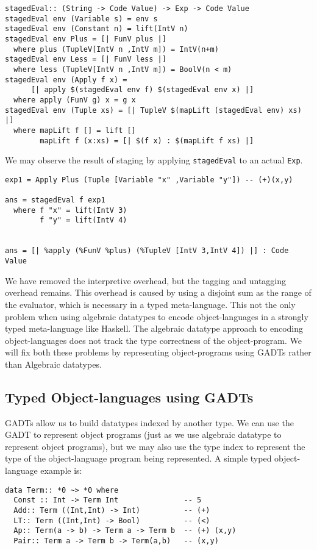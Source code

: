 \documentclass[11pt,twoside,A4]{llncs}
\begin{document}
{\small 
\begin{verbatim}
stagedEval:: (String -> Code Value) -> Exp -> Code Value
stagedEval env (Variable s) = env s
stagedEval env (Constant n) = lift(IntV n)
stagedEval env Plus = [| FunV plus |]
  where plus (TupleV[IntV n ,IntV m]) = IntV(n+m)
stagedEval env Less = [| FunV less |]
  where less (TupleV[IntV n ,IntV m]) = BoolV(n < m) 
stagedEval env (Apply f x) = 
      [| apply $(stagedEval env f) $(stagedEval env x) |]
  where apply (FunV g) x = g x
stagedEval env (Tuple xs) = [| TupleV $(mapLift (stagedEval env) xs) |]
  where mapLift f [] = lift []
        mapLift f (x:xs) = [| $(f x) : $(mapLift f xs) |]
\end{verbatim}}
We may observe the result of staging by applying {\tt stagedEval} to
an actual {\tt Exp}.

{\small 
\begin{verbatim}
exp1 = Apply Plus (Tuple [Variable "x" ,Variable "y"]) -- (+)(x,y)

ans = stagedEval f exp1 
  where f "x" = lift(IntV 3)
        f "y" = lift(IntV 4)
        

ans = [| %apply (%FunV %plus) (%TupleV [IntV 3,IntV 4]) |] : Code Value  
\end{verbatim}}

We have removed the interpretive overhead, but the tagging and untagging
overhead remains. This overhead is caused by using a disjoint sum as
the range of the evaluator, which is necessary in a typed meta-language.
This not the only problem when using algebraic datatypes to encode
object-languages in a strongly typed meta-language like Haskell. The
algebraic datatype approach to encoding object-languages does not track
the type correctness of the object-program. We will fix both these
problems by representing object-programs using GADTs rather than
Algebraic datatypes.

\subsection{Typed Object-languages using GADTs} \label{tagged}

GADTs allow
us to build datatypes indexed by another type. We can use the
GADT to represent object programs (just as we use algebraic
datatype to represent object programs), but we may also
use the type index to represent the type of the object-language
program being represented. A simple typed object-language example is:

{\small
\begin{verbatim}
data Term:: *0 ~> *0 where
  Const :: Int -> Term Int               -- 5
  Add:: Term ((Int,Int) -> Int)          -- (+)
  LT:: Term ((Int,Int) -> Bool)          -- (<)
  Ap:: Term(a -> b) -> Term a -> Term b  -- (+) (x,y)
  Pair:: Term a -> Term b -> Term(a,b)   -- (x,y)
\end{verbatim}}
\end{document}
